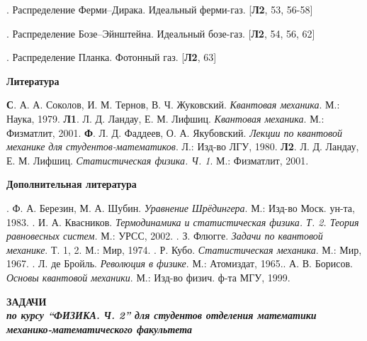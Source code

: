 \documentclass[a4paper,12pt]{article}
\begin{document}
. Распределение Ферми--Дирака. Идеальный ферми-газ.
[\textbf{Л2}, 53, 56-58]

. Распределение Бозе--Эйнштейна. Идеальный бозе-газ.
[\textbf{Л2}, 54, 56, 62]


. Распределение Планка. Фотонный газ. [\textbf{Л2},
63]


\vspace{2cm}

\centerline{\bf Литература}

\bigskip

\noindent \textbf{С}. А. А. Соколов, И. М. Тернов, В. Ч.
Жуковский. \textit{Квантовая механика}. \newline
 М.: Наука, 1979. \newline
\textbf{Л1}. Л. Д. Ландау, Е. М. Лифшиц. \textit{Квантовая механика}. М.:
Физматлит, 2001. \newline
 \textbf{Ф}. Л. Д. Фаддеев, О. А. Якубовский. \textit{Лекции по квантовой
механике \newline
 для студентов-математиков}. Л.: Изд-во ЛГУ, 1980. \newline
\textbf{Л2}. Л. Д. Ландау, Е. М. Лифшиц. \textit{Статистическая физика. Ч.
1}. \newline
 М.: Физматлит, 2001.

\bigskip

\centerline{\bf Дополнительная литература}

\bigskip

. Ф. А. Березин, М. А. Шубин. \textit{Уравнение
Шрёдингера}. М.: Изд-во Моск. ун-та, 1983. . И. А.
Квасников. \textit{Термодинамика и статистическая физика. Т. 2.
Теория равновесных систем.} М.: УРСС, 2002.
. З. Флюгге. \textit{Задачи по квантовой механике}. Т.
1, 2. М.: Мир, 1974.
. Р. Кубо. \textit{Статистическая механика}. М.: Мир,
1967. . Л. де Бройль. \textit{Революция в физике}. М.:
Атомиздат, 1965.. А. В. Борисов. \textit{Основы
квантовой механики}. М.: Изд-во физич. ф-та МГУ, 1999.

\newpage
\mbox{} %
\begin{center}
\textbf{ЗАДАЧИ \\ \textit{по курсу ``ФИЗИКА. Ч. 2'' для студентов
отделения математики механико-математического факультета}}
\end{center}
\end{document}
